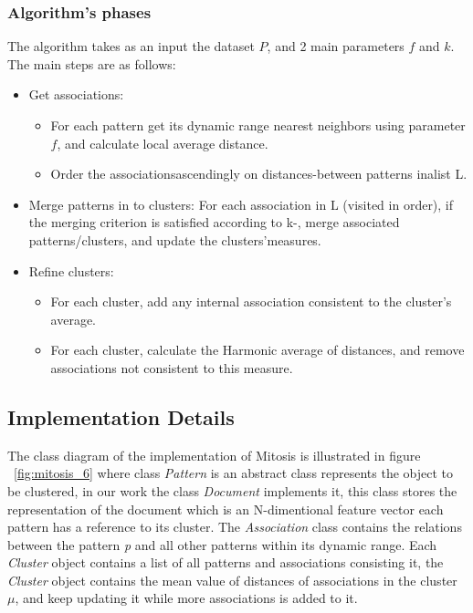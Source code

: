 \subsubsection{Algorithm's phases}\label{sec:phases}

The algorithm takes as an input the dataset $P$, and 2 main parameters $f$ and $k$. The main steps are as follows:
\begin{itemize}

\item {Get associations:
\begin{itemize}
	\item For each pattern get its dynamic range nearest neighbors using parameter $f$, and calculate local average distance.
	\item Order the associationsascendingly on distances-between patterns inalist L.
\end{itemize}
}


\item {Merge patterns in to clusters: For each association in L (visited in order), if the merging criterion is satisfied according to k-, merge
associated patterns/clusters, and update the clusters'measures.}
\item {Refine clusters:
\begin{itemize}
\item For each cluster, add any internal association consistent to the cluster's average.
\item For each cluster, calculate the Harmonic average of distances, and remove associations not consistent to this measure.
\end{itemize}
}
\end{itemize}


\subsection{Implementation Details}\label{sec:implementation}
The class diagram of the implementation of Mitosis is illustrated in figure ~\ref{fig:mitosis_6} where class \textit{Pattern} is an abstract class represents the object to be clustered, in our work the class \textit{Document} implements it, this class stores the representation of the document which is an N-dimentional feature vector each pattern has a reference to its cluster.
The \textit{Association} class contains the relations between the pattern \textit{p} and all other patterns within its dynamic range. Each \textit{Cluster} object contains a list of all patterns and associations consisting it, the \textit{Cluster} object contains the mean value of distances of associations in the cluster $\mu$, and keep updating it while more associations is added to it.

